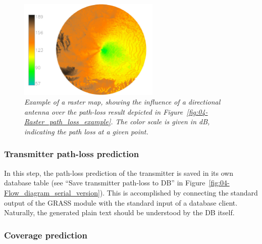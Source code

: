 \begin{figure}[h]
\centering

\includegraphics[width=0.6\textwidth]{04-framework_design_and_implementation/img/antenna_calculation}

\caption{\textit{\emph{Example of a raster map, showing the influence of a
directional antenna over the path-loss result depicted in Figure~\ref{fig:04-Raster_path_loss_example}.
The color scale is given in dB, indicating the path loss at a given
point. \label{fig:04-Raster_antenna_example}}}}
\end{figure}



\subsubsection{Transmitter path-loss prediction \label{sub:04-Transmitter_path_loss_prediction}}

In this step, the path-loss prediction of the transmitter is saved
in its own database table (see ``Save transmitter path-loss to DB''
in Figure~\ref{fig:04-Flow_diagram_serial_version}). This is accomplished
by connecting the standard output of the GRASS module with the standard
input of a database client. Naturally, the generated plain text should
be understood by the DB itself.


\subsubsection{Coverage prediction \label{sub:04-Coverage_prediction}}

